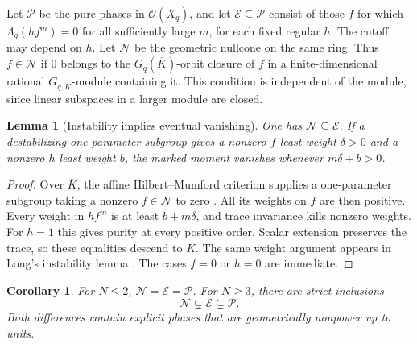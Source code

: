\documentclass[11pt]{article}
\newtheorem{lemma}[theorem]{Lemma}
\newtheorem{corollary}[theorem]{Corollary}
\newcommand{\Lq}{\Lambda_q}
\begin{document}
Let \(\mathcal P\) be the pure phases in \(\mathcal O(X_q)\), and let
\(\mathcal E\subseteq\mathcal P\) consist of those \(f\) for which
\(\Lq(h f^m)=0\) for all sufficiently large \(m\), for each fixed
regular \(h\). The cutoff may depend on \(h\).
Let \(\mathcal N\) be the geometric nullcone on the same ring.
Thus \(f\in\mathcal N\) if \(0\) belongs to the
\(G_q(\overline K)\)-orbit closure of \(f\) in a finite-dimensional
rational \(G_{q,\overline K}\)-module containing it. This condition
is independent of the module, since linear subspaces in a larger
module are closed.

\begin{lemma}[Instability implies eventual vanishing]\label{lem:unstable}
One has \(\mathcal N\subseteq\mathcal E\). If a destabilizing
one-parameter subgroup gives a nonzero \(f\) least weight
\(\delta>0\) and a nonzero \(h\) least weight \(b\), the marked
moment vanishes whenever \(m\delta+b>0\).
\end{lemma}

\begin{proof}
Over \(\overline K\), the affine Hilbert--Mumford criterion
supplies a one-parameter subgroup taking
a nonzero \(f\in\mathcal N\) to zero \cite[p.~1]{Kempf}.
All its weights on \(f\) are then positive. Every weight in \(h f^m\)
is at least \(b+m\delta\), and trace invariance kills nonzero weights.
For \(h=1\) this gives purity at every positive order. Scalar extension
preserves the trace, so these equalities descend to \(K\).
The same weight argument appears in Long's instability lemma
\cite[Lem.~2.1]{Long}.
The cases \(f=0\) or \(h=0\) are immediate.
\end{proof}

\begin{corollary}\label{cor:nullcone}
For \(N\le2\), \(\mathcal N=\mathcal E=\mathcal P\).
For \(N\ge3\), there are strict inclusions
\[
             \mathcal N\subsetneq\mathcal E\subsetneq\mathcal P.
\]
Both differences contain explicit phases that are geometrically nonpower
up to units.
\end{corollary}
\end{document}
